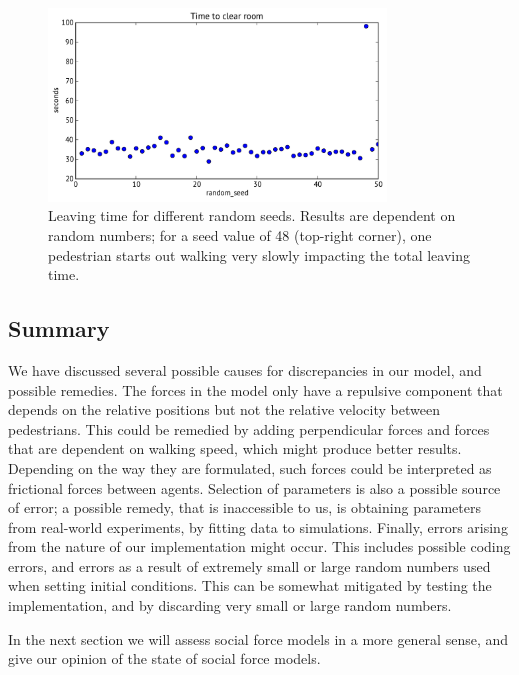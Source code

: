 \begin{figure}[h]
    \centering
    \includegraphics[width=0.8\textwidth]{Figures/random-seed-variations.pdf}
    \caption[Leaving time for different random seeds]{Leaving time for
    different random seeds. Results are dependent on random numbers; for a
    seed value of 48 (top-right corner), one pedestrian starts out walking
    very slowly impacting the total leaving time.}
    \label{fig:random-seed}
\end{figure}


\subsection{Summary}
We have discussed several possible causes for discrepancies in our model, and
possible remedies. The forces in the model only have a repulsive component
that depends on the relative positions but not the relative velocity between
pedestrians.  This could be remedied by adding perpendicular forces and forces
that are dependent on walking speed, which might produce better results.
Depending on the way they are formulated, such forces could be interpreted as
frictional forces between agents. Selection of parameters is also a possible
source of error; a possible remedy, that is inaccessible to us, is obtaining
parameters from real-world experiments, by fitting data to simulations.
Finally, errors arising from the nature of our implementation might occur.
This includes possible coding errors, and errors as a result of extremely
small or large random numbers used when setting initial conditions. This can
be somewhat mitigated by testing the implementation, and by discarding very
small or large random numbers.

In the next section we will assess social force models in a more general
sense, and give our opinion of the state of social force models.
